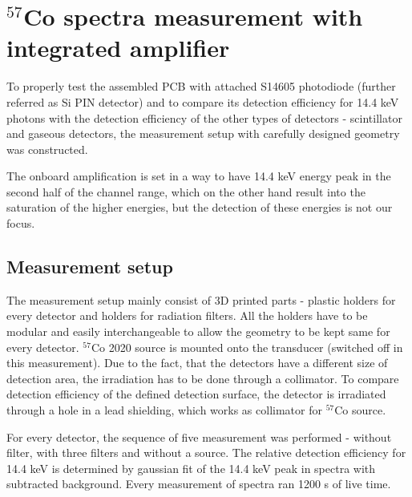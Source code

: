 \chapter{$^{57}$Co spectra measurement with integrated amplifier} 

To properly test the assembled PCB with attached S14605 photodiode (further referred as Si PIN detector) and to compare its detection efficiency for 14.4 keV photons with the detection efficiency of the other types of detectors - scintillator and gaseous detectors, the measurement setup with carefully designed geometry was constructed.

%

\par

The onboard amplification is set in a way to have 14.4 keV energy peak in the second half of the channel range, which on the other hand result into the saturation of the higher energies, but the detection of these energies is not our focus.



\section{Measurement setup}
The measurement setup mainly consist of 3D printed parts - plastic holders for every detector and holders for radiation filters. All the holders have to be modular and easily interchangeable to allow the geometry to be kept same for every detector.
$^{57}$Co 2020 source is mounted onto the transducer (switched off in this measurement). Due to the fact, that the detectors have a different size of detection area, the irradiation has to be done through a collimator. To compare detection efficiency of the defined detection surface, the detector is irradiated through a hole in a lead shielding, which works as collimator for $^{57}$Co source.

\par
For every detector, the sequence of five measurement was performed - without filter, with three filters and without a source. The relative detection efficiency for 14.4 keV is determined by gaussian fit of the 14.4 keV peak in spectra with subtracted background. Every measurement of spectra ran 1200 s of live time.


